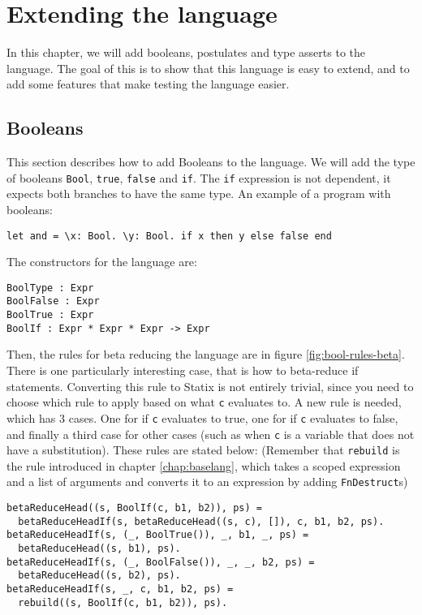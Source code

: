 \chapter{\label{chap:bools}Extending the language}

In this chapter, we will add booleans, postulates and type asserts to the language. The goal of this is to show that this language is easy to extend, and to add some features that make testing the language easier.

\section{Booleans}

This section describes how to add Booleans to the language. We will add the type of booleans \verb|Bool|, \verb|true|, \verb|false| and \verb|if|. The \verb|if| expression is not dependent, it expects both branches to have the same type. An example of a program with booleans: 

\begin{lstlisting}
let and = \x: Bool. \y: Bool. if x then y else false end
\end{lstlisting}
The constructors for the language are:

\begin{lstlisting}
BoolType : Expr
BoolFalse : Expr
BoolTrue : Expr
BoolIf : Expr * Expr * Expr -> Expr
\end{lstlisting}
Then, the rules for beta reducing the language are in figure \ref{fig:bool-rules-beta}. There is one particularly interesting case, that is how to beta-reduce if statements. Converting this rule to Statix is not entirely trivial, since you need to choose which rule to apply based on what \verb|c| evaluates to. A new rule is needed, which has 3 cases. One for if \verb|c| evaluates to true, one for if \verb|c| evaluates to false, and finally a third case for other cases (such as when \verb|c| is a variable that does not have a substitution). These rules are stated below: (Remember that \verb|rebuild| is the rule introduced in chapter \ref{chap:baselang}, which takes a scoped expression and a list of arguments and converts it to an expression by adding \verb|FnDestruct|s)

\begin{lstlisting}
betaReduceHead((s, BoolIf(c, b1, b2)), ps) = 
  betaReduceHeadIf(s, betaReduceHead((s, c), []), c, b1, b2, ps).
betaReduceHeadIf(s, (_, BoolTrue()), _, b1, _, ps) = 
  betaReduceHead((s, b1), ps).
betaReduceHeadIf(s, (_, BoolFalse()), _, _, b2, ps) = 
  betaReduceHead((s, b2), ps).
betaReduceHeadIf(s, _, c, b1, b2, ps) = 
  rebuild((s, BoolIf(c, b1, b2)), ps).
\end{lstlisting}

